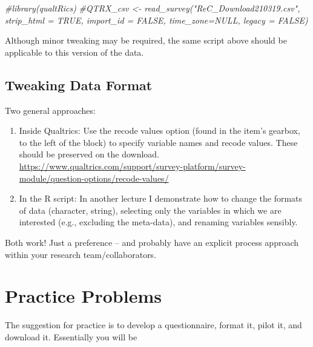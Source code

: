 \documentclass[
  english,
]{book}
\newenvironment{Shaded}{\begin{snugshade}}{\end{snugshade}}
\newcommand{\CommentTok}[1]{\textcolor[rgb]{0.56,0.35,0.01}{\textit{#1}}}
\begin{document}
\begin{Shaded}
\begin{Highlighting}[]
\CommentTok{#library(qualtRics)}
\CommentTok{#QTRX_csv <- read_survey("ReC_Download210319.csv", strip_html = TRUE, import_id = FALSE, time_zone=NULL, legacy = FALSE)}
\end{Highlighting}
\end{Shaded}

Although minor tweaking may be required, the same script above should be applicable to this version of the data.

\hypertarget{tweaking-data-format}{%
\subsection{Tweaking Data Format}\label{tweaking-data-format}}

Two general approaches:

\begin{enumerate}
\def\labelenumi{\arabic{enumi}.}
\item
  Inside Qualtrics: Use the recode values option (found in the item's gearbox, to the left of the block) to specify variable names and recode values. These should be preserved on the download. \url{https://www.qualtrics.com/support/survey-platform/survey-module/question-options/recode-values/}
\item
  In the R script: In another lecture I demonstrate how to change the formats of data (character, string), selecting only the variables in which we are interested (e.g., excluding the meta-data), and renaming variables sensibly.
\end{enumerate}

Both work! Just a preference -- and probably have an explicit process approach within your research team/collaborators.

\hypertarget{practice-problems-1}{%
\section{Practice Problems}\label{practice-problems-1}}

The suggestion for practice is to develop a questionnaire, format it, pilot it, and download it. Essentially you will be
\end{document}
